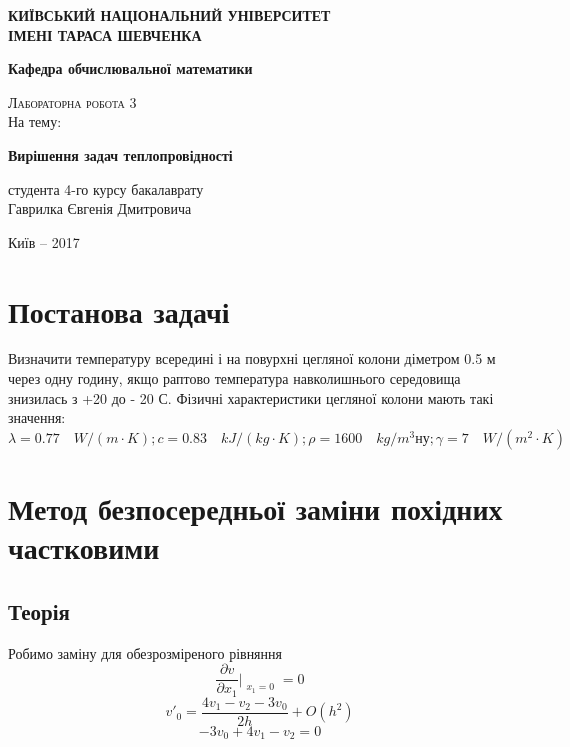 \documentclass[fontsize=14pt,DIV=1,a4paper]{scrartcl}
\begin{document}
	\begin{titlepage}
		\begin{center}
			\large
			\textbf{КИЇВСЬКИЙ НАЦІОНАЛЬНИЙ УНІВЕРСИТЕТ \\
			ІМЕНІ ТАРАСА ШЕВЧЕНКА}

			\textbf{Кафедра обчислювальної математики}
			
			\vspace{6.0cm}

			\textsc{Лабораторна робота 3}\\
			На тему:

			\textbf{ Вирішення задач теплопровідності }
			\bigskip
		\end{center}
		\vfill

		\hfill
		\begin{minipage}{0.6\textwidth}
			студента 4-го курсу бакалаврату\\
			Гаврилка Євгенія Дмитровича
		\end{minipage}%
		\vfill
		
		\vspace{-2.5cm}
		
		

		\vspace{1.0cm}

		\begin{center}
			Київ – 2017
		\end{center}
	\end{titlepage}
	

	\newpage
	\section*{Постанова задачі}
	Визначити температуру всередині і на повурхні цегляної колони діметром 0.5 м через одну годину, якщо раптово температура навколишнього середовища знизилась з +20 до - 20 С. Фізичні характеристики цегляної колони мають такі значення: $\lambda = 0.77\quad W/(m \cdot K); c= 0.83\quad kJ/(kg \cdot K); \rho = 1600 \quad kg/m^3ну ; \gamma = 7 \quad W/(m^2 \cdot K) $
	
	\newpage
	\section{Метод безпосередньої заміни похідних частковими}
	\subsection{Теорія}
	Робимо заміну для обезрозміреного рівняння
	\begin{equation}
		\frac{\partial v}{\partial x_1} \Bigr|_{\substack{x_1=0}} = 0 
	\end{equation}
	\begin{equation}
		v'_0 = \frac{4v_1-v_2-3v_0}{2h} + O(h^2)
	\end{equation}
	\begin{equation}
		-3v_0+4v_1-v_2=0 
	\end{equation}
	
\end{document}
